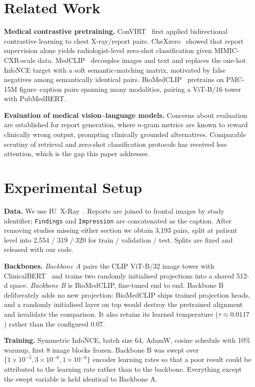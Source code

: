 \documentclass[runningheads]{llncs}
\begin{document}
\section{Related Work}

\textbf{Medical contrastive pretraining.} ConVIRT~\cite{zhang2020convirt} first
applied bidirectional contrastive learning to chest X-ray/report pairs.
CheXzero~\cite{tiu2022chexzero} showed that report supervision alone yields
radiologist-level zero-shot classification given MIMIC-CXR-scale data.
MedCLIP~\cite{wang2022medclip} decouples images and text and replaces the
one-hot InfoNCE target with a soft semantic-matching matrix, motivated by false
negatives among semantically identical pairs.
BioMedCLIP~\cite{zhang2023biomedclip} pretrains on PMC-15M figure--caption pairs
spanning many modalities, pairing a ViT-B/16 tower with PubMedBERT.

\textbf{Evaluation of medical vision--language models.} Concerns about
evaluation are established for report generation, where $n$-gram metrics are
known to reward clinically wrong output, prompting clinically grounded
alternatives. Comparable scrutiny of retrieval and zero-shot classification
protocols has received less attention, which is the gap this paper addresses.

\section{Experimental Setup}

\textbf{Data.} We use IU~X-Ray~\cite{demner2016openi}. Reports are joined to
frontal images by study identifier; \texttt{Findings} and \texttt{Impression} are
concatenated as the caption. After removing studies missing either section we
obtain 3{,}193 pairs, split at patient level into 2{,}554 / 319 / 320 for
train / validation / test. Splits are fixed and released with our code.

\textbf{Backbones.} \emph{Backbone A} pairs the CLIP ViT-B/32 image tower with
ClinicalBERT~\cite{alsentzer2019clinicalbert} and trains two randomly
initialised projections into a shared 512-d space. \emph{Backbone B} is
BioMedCLIP, fine-tuned end to end. Backbone B deliberately adds no new
projection: BioMedCLIP ships trained projection heads, and a randomly
initialised layer on top would destroy the pretrained alignment and invalidate
the comparison. It also retains its learned temperature ($\tau \approx 0.0117$)
rather than the configured $0.07$.

\textbf{Training.} Symmetric InfoNCE, batch size 64, AdamW, cosine schedule with
10\% warmup, first 8 image blocks frozen. Backbone B was swept over
$\{1\!\times\!10^{-5}, 3\!\times\!10^{-6}, 1\!\times\!10^{-6}\}$ encoder learning
rates so that a poor result could be attributed to the learning rate rather than
to the backbone. Everything except the swept variable is held identical to
Backbone A.
\end{document}
